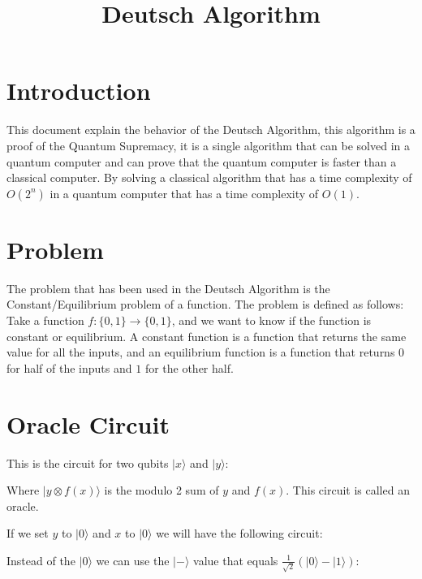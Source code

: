 \documentclass{article}
\begin{document}
\title{Deutsch Algorithm}
\section{Introduction}
This document explain the behavior of the Deutsch Algorithm, this algorithm is a proof
of the Quantum Supremacy, it is a single algorithm that can be solved in a quantum computer
and can prove that the quantum computer is faster than a classical computer. By 
solving a classical algorithm that has a time complexity of $O(2^n)$ in a quantum computer
that has a time complexity of $O(1)$.

\section{Problem}

The problem that has been used in the Deutsch Algorithm is the Constant/Equilibrium problem 
of a function. The problem is defined as follows:
Take a function $f:\{0,1\} \rightarrow \{0,1\}$, and we want to know if the function is
constant or equilibrium. A constant function is a function that returns the same value
for all the inputs, and an equilibrium function is a function that returns $0$ for half
of the inputs and $1$ for the other half.

\section{Oracle Circuit}
This is the circuit for two qubits $|x\rangle$ and $|y\rangle$:


Where $|y \otimes f(x)\rangle$ is the modulo 2 sum of $y$ and $f(x)$. This circuit
is called an oracle.

If we set $y$ to $|0\rangle$ and $x$ to $|0\rangle$ we will have the following circuit:


Instead of the $|0\rangle$ we can use the $|-\rangle$ value that equals $\frac{1}{\sqrt{2}}(|0\rangle - |1\rangle)$:

\end{document}

